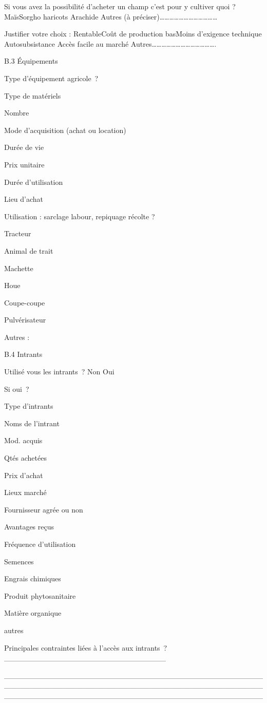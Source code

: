 \documentclass[12pt,oneside]{report}
\begin{document}
Si vous avez la possibilité d’acheter un champ c’est pour y cultiver quoi ? MaïsSorgho haricots    Arachide  Autres (à préciser)………………………………

Justifier votre choix : RentableCoût de production basMoins d’exigence technique Autosubsistance  Accès facile au marché Autres………………………………….

B.3 Équipements

Type d’équipement agricole ?

Type de matériels

Nombre

Mode d’acquisition (achat ou location)

Durée de vie

Prix unitaire

Durée d’utilisation

Lieu d’achat

Utilisation : sarclage labour, repiquage récolte ?

Tracteur

Animal de trait

Machette

Houe

Coupe-coupe

Pulvérisateur

Autres :

B.4 Intrants

Utilisé vous les intrants ? Non     Oui

Si oui ?

Type d’intrants

Noms de l’intrant

Mod. acquis

Qtés achetées

Prix d’achat

Lieux marché

Fournisseur agrée ou non

Avantages reçus

Fréquence d’utilisation

Semences

Engrais chimiques

Produit phytosanitaire

Matière organique

autres

Principales contraintes liées à l’accès aux intrants ?\_\_\_\_\_\_\_\_\_\_\_\_\_\_\_\_\_\_\_\_\_\_\_\_\_\_\_\_\_\_

\_\_\_\_\_\_\_\_\_\_\_\_\_\_\_\_\_\_\_\_\_\_\_\_\_\_\_\_\_\_\_\_\_\_\_\_\_\_\_\_\_\_\_\_\_\_\_\_\_\_\_\_\_\_\_\_\_\_\_\_\_\_\_\_\_\_\_\_\_\_\_\_\_\_\_\_\_\_\_\_\_\_\_\_\_\_\_\_\_\_\_\_\_\_\_\_\_\_\_\_\_\_\_\_\_\_\_\_\_\_\_\_\_\_\_\_\_\_\_\_\_\_\_\_\_\_\_\_\_\_\_\_\_\_\_\_\_\_\_\_\_\_\_\_
\end{document}
